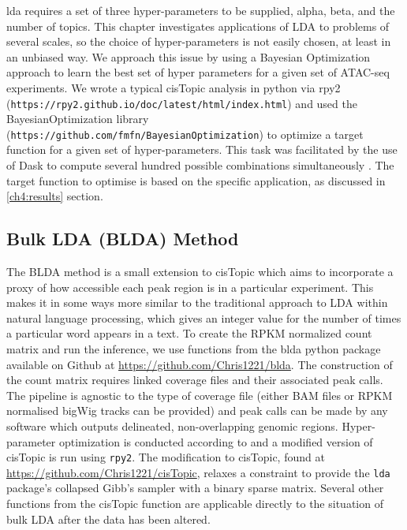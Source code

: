 \gls{lda} requires a set of three hyper-parameters to be supplied, alpha, beta, and the number of topics. This chapter investigates applications of LDA to problems of several scales, so the choice of hyper-parameters is not easily chosen, at least in an unbiased way. We approach this issue by using a Bayesian Optimization approach to learn the best set of hyper parameters for a given set of ATAC-seq experiments. We wrote a typical cisTopic analysis in python via rpy2 ({\tt https://rpy2.github.io/doc/latest/html/index.html}) and used the BayesianOptimization library ({\tt https://github.com/fmfn/BayesianOptimization}) to optimize a target function for a given set of hyper-parameters. This task was facilitated by the use of Dask to compute several hundred possible combinations simultaneously \cite{Rocklin2015}. The target function to optimise is based on the specific application, as discussed in \autoref{ch4:results} section.

\subsection{Bulk LDA (BLDA) Method} \label{ch4:method_blda}

The BLDA method is a small extension to cisTopic which aims to incorporate a proxy of how accessible each peak region is in a particular experiment. This makes it in some ways more similar to the traditional approach to LDA within natural language processing, which gives an integer value for the number of times a particular word appears in a text. To create the RPKM normalized count matrix and run the inference, we use functions from the blda python package available on Github at \url{https://github.com/Chris1221/blda}.  The construction of the count matrix requires linked coverage files and their associated peak calls. The pipeline is agnostic to the type of coverage file (either BAM files or RPKM normalised bigWig tracks can be provided) and peak calls can be made by any software which outputs delineated, non-overlapping genomic regions. Hyper-parameter optimization is conducted according to  and a modified version of cisTopic is run using {\tt rpy2}. The modification to cisTopic, found at \url{https://github.com/Chris1221/cisTopic}, relaxes a constraint to provide the {\tt lda} package's collapsed Gibb's sampler with a binary sparse matrix. Several other functions from the cisTopic function are applicable directly to the situation of bulk LDA after the data has been altered. 

